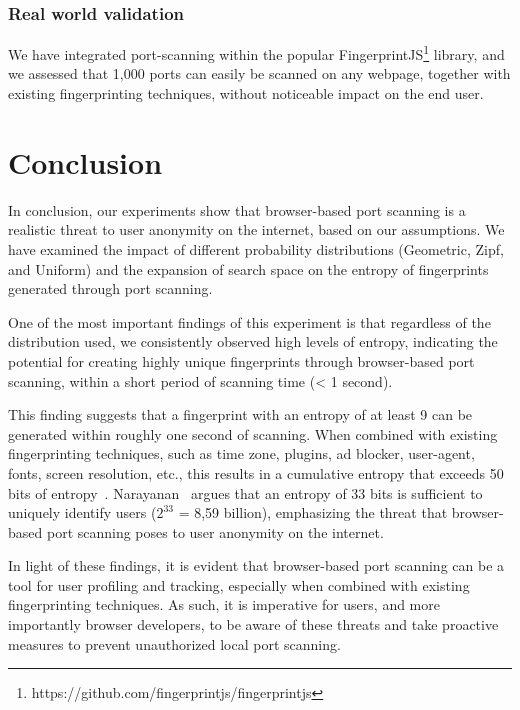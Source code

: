 \subsubsection{Real world validation}

We have integrated port-scanning within the popular FingerprintJS\footnote{https://github.com/fingerprintjs/fingerprintjs} library, and we assessed that 1,000 ports can easily be scanned on any webpage, together with existing fingerprinting techniques, without noticeable impact on the end user. 


\section{Conclusion}

In conclusion, our experiments show that browser-based port scanning is a realistic threat to user anonymity on the internet, based on our assumptions. We have examined the impact of different probability distributions (Geometric, Zipf, and Uniform) and the expansion of search space on the entropy of fingerprints generated through port scanning.

One of the most important findings of this experiment is that regardless of the distribution used, we consistently observed high levels of entropy, indicating the potential for creating highly unique fingerprints through browser-based port scanning, within a short period of scanning time (< 1 second).

This finding suggests that a fingerprint with an entropy of at least 9 can be generated within roughly one second of scanning. When combined with existing fingerprinting techniques, such as time zone, plugins, ad blocker, user-agent, fonts, screen resolution, etc., this results in a cumulative entropy that exceeds 50 bits of entropy~. Narayanan~ argues that an entropy of 33 bits is sufficient to uniquely identify users ($2^{33}$ = 8,59 billion), emphasizing the threat that browser-based port scanning poses to user anonymity on the internet.

In light of these findings, it is evident that browser-based port scanning can be a tool for user profiling and tracking, especially when combined with existing fingerprinting techniques. As such, it is imperative for users, and more importantly browser developers, to be aware of these threats and take proactive measures to prevent unauthorized local port scanning.







